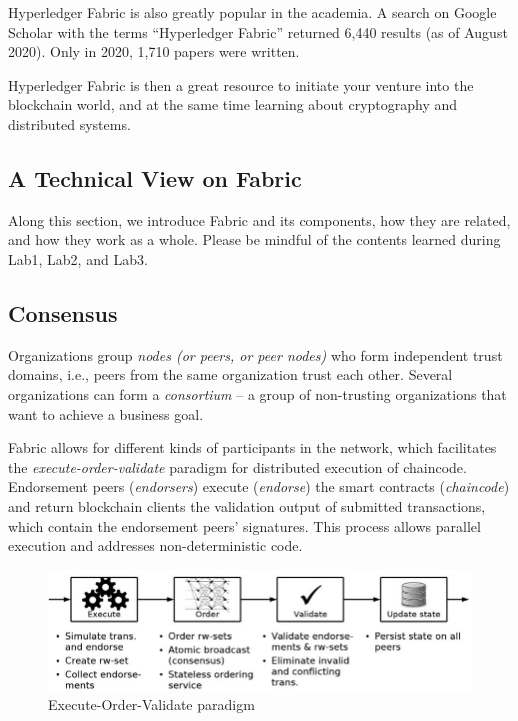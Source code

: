\documentclass[12pt,a4paper]{article}
\theoremstyle{definition}
\begin{document}
Hyperledger Fabric is also greatly popular in the academia. A search on Google Scholar with the terms ``Hyperledger Fabric'' returned 6,440 results (as of August 2020). Only in 2020, 1,710 papers were written. 

Hyperledger Fabric is then a great resource to initiate your venture into the blockchain world, and at the same time learning about cryptography and distributed systems. 

\subsection{A Technical View on Fabric}
Along this section, we introduce Fabric and its components, how they are related, and how they work as a whole. Please be mindful of the contents learned during Lab1, Lab2, and Lab3.

\subsection{Consensus}

Organizations group \emph{nodes (or peers, or peer nodes)} who form independent trust domains, i.e., peers from the same organization trust each other. Several organizations can form a \textit{consortium} -- a group of non-trusting organizations that want to achieve a business goal. 

Fabric allows for different kinds of participants in the network, which facilitates the \emph{execute-order-validate} paradigm for distributed execution of chaincode. Endorsement peers (\emph{endorsers}) execute (\emph{endorse}) the smart contracts (\emph{chaincode}) and return blockchain clients the validation output of submitted transactions,  which contain the endorsement peers' signatures. This process allows parallel execution and addresses non-deterministic code. 

\begin{figure}[h]

    \includegraphics[scale=0.6]{figures/execute_order_validate.png}
    \centering
 \caption{Execute-Order-Validate paradigm \cite{execute_order_validate}}
    \label{fig:hf}
\end{figure}
\end{document}
